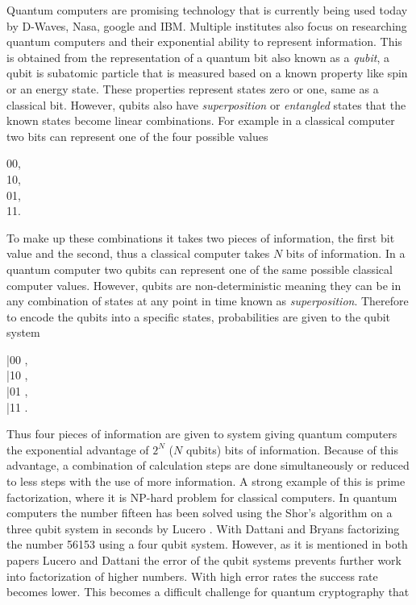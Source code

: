 Quantum computers are promising technology that is currently being used today by D-Waves, Nasa, google and IBM. Multiple institutes also focus on researching quantum computers and their exponential ability to represent information. This is obtained from the representation of a quantum bit also known as a \textit{qubit}, a qubit is subatomic particle that is measured based on a known property like spin or an energy state. These properties represent states zero or one, same as a
classical bit. However, qubits also have \textit{superposition} or \textit{entangled} states that the known states become linear combinations. For example in a classical computer two bits can represent one of the four possible values
\begin{equations*}
    00,\\
    10,\\
    01,\\
    11.
\end{equations*}
To make up these combinations it takes two pieces of information, the first bit value and the second, thus a classical computer takes $N$ bits of information. In a quantum computer two qubits can represent one of the same possible classical computer values. However, qubits are non-deterministic meaning they can be in any combination of states at any point in time known as \textit{superposition}. Therefore to encode the qubits into a specific states, probabilities are
given to the qubit system 
\begin{equations*}
    \alpha |00 \rangle,\\
    \beta  |10 \rangle,\\
    \gamma |01 \rangle,\\
    \delta |11 \rangle.\\
\end{equations*}
Thus four pieces of information are given to system giving quantum computers the exponential advantage of $2^N$ ($N$ qubits) bits of information. Because of this advantage, a combination of calculation steps are done simultaneously or reduced to less steps with the use of more information. A strong example of this is prime factorization, where it is NP-hard problem for classical computers. In quantum computers the number fifteen has been solved using the Shor's algorithm
on a three qubit system in seconds by Lucero \cite{Lucero2013}. With Dattani and Bryans \cite{Dattani2014} factorizing the number 56153 using a four qubit system. However, as it is mentioned in both papers Lucero \cite{Lucero2013} and Dattani \cite{Dattani2014} the error of the qubit systems prevents further work into factorization of higher numbers. With high error rates the success rate becomes lower. This becomes a difficult challenge for quantum cryptography that
